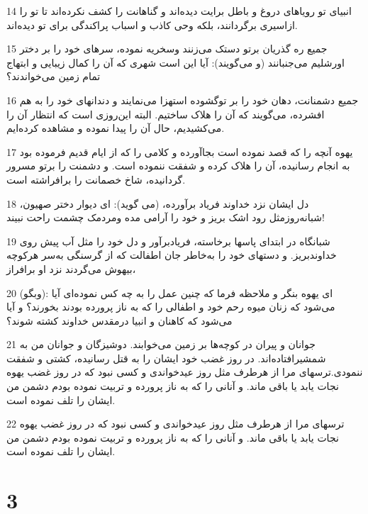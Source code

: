 \par 14 انبیای تو رویاهای دروغ و باطل برایت دیده‌اند و گناهانت را کشف نکرده‌اند تا تو را ازاسیری برگردانند، بلکه وحی کاذب و اسباب پراکندگی برای تو دیده‌اند.
\par 15 جمیع ره گذریان برتو دستک می‌زنند وسخریه نموده، سرهای خود را بر دختر اورشلیم می‌جنبانند (و می‌گویند): آیا این است شهری که آن را کمال زیبایی و ابتهاج تمام زمین می‌خواندند؟
\par 16 جمیع دشمنانت، دهان خود را بر توگشوده استهزا می‌نمایند و دندانهای خود را به هم افشرده، می‌گویند که آن را هلاک ساختیم. البته این‌روزی است که انتظار آن را می‌کشیدیم، حال آن را پیدا نموده و مشاهده کرده‌ایم.
\par 17 یهوه آنچه را که قصد نموده است بجاآورده و کلامی را که از ایام قدیم فرموده بود به انجام رسانیده، آن را هلاک کرده و شفقت ننموده است. و دشمنت را برتو مسرور گردانیده، شاخ خصمانت را برافراشته است.
\par 18 دل ایشان نزد خداوند فریاد برآورده، (می گوید): ای دیوار دختر صهیون، شبانه‌روزمثل رود اشک بریز و خود را آرامی مده ومردمک چشمت راحت نبیند!
\par 19 شبانگاه در ابتدای پاسها برخاسته، فریادبرآور و دل خود را مثل آب پیش روی خداوندبریز. و دستهای خود را به‌خاطر جان اطفالت که از گرسنگی به‌سر هرکوچه بیهوش می‌گردند نزد او برافراز،
\par 20 (وبگو): ای یهوه بنگر و ملاحظه فرما که چنین عمل را به چه کس نموده‌ای آیا می‌شود که زنان میوه رحم خود و اطفالی را که به ناز پرورده بودند بخورند؟ و آیا می‌شود که کاهنان و انبیا درمقدس خداوند کشته شوند؟
\par 21 جوانان و پیران در کوچه‌ها بر زمین می‌خوابند. دوشیزگان و جوانان من به شمشیرافتاده‌اند. در روز غضب خود ایشان را به قتل رسانیده، کشتی و شفقت ننمودی.ترسهای مرا از هرطرف مثل روز عیدخواندی و کسی نبود که در روز غضب یهوه نجات یابد یا باقی ماند. و آنانی را که به ناز پرورده و تربیت نموده بودم دشمن من ایشان را تلف نموده است.
\par 22 ترسهای مرا از هرطرف مثل روز عیدخواندی و کسی نبود که در روز غضب یهوه نجات یابد یا باقی ماند. و آنانی را که به ناز پرورده و تربیت نموده بودم دشمن من ایشان را تلف نموده است.
 
\chapter{3}

